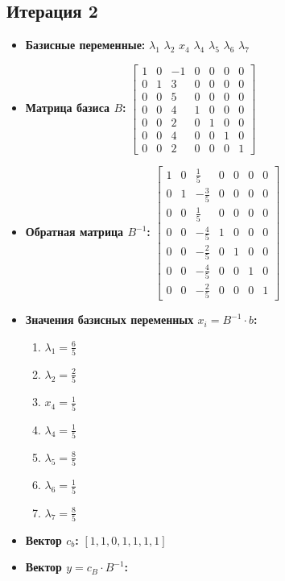 \begin{itemize}
\subsection*{Итерация 2}
\begin{itemize}
\item \textbf{Базисные переменные:}
$\lambda_1$
$\lambda_2$
$x_4$
$\lambda_4$
$\lambda_5$
$\lambda_6$
$\lambda_7$
\item \textbf{Матрица базиса $B$:}
$\left[\begin{matrix}1 & 0 & -1 & 0 & 0 & 0 & 0\\0 & 1 & 3 & 0 & 0 & 0 & 0\\0 & 0 & 5 & 0 & 0 & 0 & 0\\0 & 0 & 4 & 1 & 0 & 0 & 0\\0 & 0 & 2 & 0 & 1 & 0 & 0\\0 & 0 & 4 & 0 & 0 & 1 & 0\\0 & 0 & 2 & 0 & 0 & 0 & 1\end{matrix}\right]$
\item \textbf{Обратная матрица $B^{-1}$:}
$\left[\begin{matrix}1 & 0 & \frac{1}{5} & 0 & 0 & 0 & 0\\0 & 1 & - \frac{3}{5} & 0 & 0 & 0 & 0\\0 & 0 & \frac{1}{5} & 0 & 0 & 0 & 0\\0 & 0 & - \frac{4}{5} & 1 & 0 & 0 & 0\\0 & 0 & - \frac{2}{5} & 0 & 1 & 0 & 0\\0 & 0 & - \frac{4}{5} & 0 & 0 & 1 & 0\\0 & 0 & - \frac{2}{5} & 0 & 0 & 0 & 1\end{matrix}\right]$
\item \textbf{Значения базисных переменных $ x_i = B^{-1} \cdot b$:}
\begin{enumerate}
\item $\lambda_1 = \frac{6}{5}$
\item $\lambda_2 = \frac{2}{5}$
\item $x_4 = \frac{1}{5}$
\item $\lambda_4 = \frac{1}{5}$
\item $\lambda_5 = \frac{8}{5}$
\item $\lambda_6 = \frac{1}{5}$
\item $\lambda_7 = \frac{8}{5}$
\end{enumerate}
\item \textbf{Вектор $c_b$:}
$[1, 1, 0, 1, 1, 1, 1]$
\item \textbf{Вектор $y = c_B \cdot B^{-1}$:}

\end{itemize}
\end{itemize}
